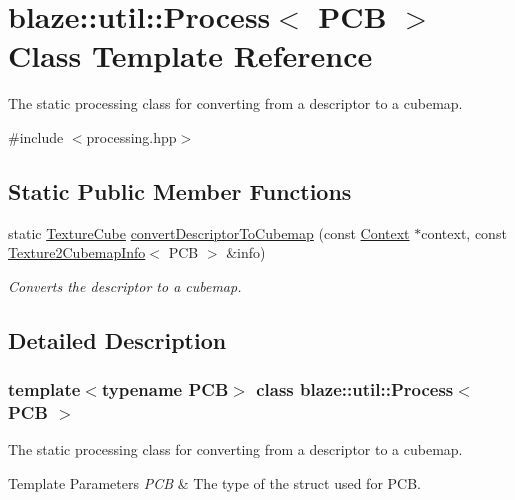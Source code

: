 \hypertarget{classblaze_1_1util_1_1Process}{}\section{blaze\+:\+:util\+:\+:Process$<$ P\+CB $>$ Class Template Reference}
\label{classblaze_1_1util_1_1Process}


The static processing class for converting from a descriptor to a cubemap.  




{\ttfamily \#include $<$processing.\+hpp$>$}

\subsection*{Static Public Member Functions}
\begin{DoxyCompactItemize}
\item 
static \hyperlink{classblaze_1_1TextureCube}{Texture\+Cube} \hyperlink{classblaze_1_1util_1_1Process_a56e7bdeca0b7e0af8b8ace326c63d46e}{convert\+Descriptor\+To\+Cubemap} (const \hyperlink{classblaze_1_1Context}{Context} $\ast$context, const \hyperlink{structblaze_1_1util_1_1Texture2CubemapInfo}{Texture2\+Cubemap\+Info}$<$ P\+CB $>$ \&info)
\begin{DoxyCompactList}\small\item\em Converts the descriptor to a cubemap. \end{DoxyCompactList}\end{DoxyCompactItemize}


\subsection{Detailed Description}
\subsubsection*{template$<$typename P\+CB$>$\newline
class blaze\+::util\+::\+Process$<$ P\+C\+B $>$}

The static processing class for converting from a descriptor to a cubemap. 


\begin{DoxyTemplParams}{Template Parameters}
{\em P\+CB} & The type of the struct used for P\+CB. \\
\hline
\end{DoxyTemplParams}


